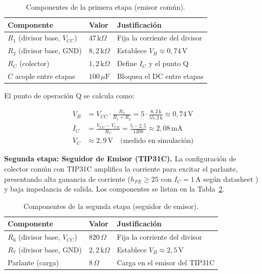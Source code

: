 \documentclass[12pt,onecolumn]{IEEEtran}
\begin{document}
\begin{table}[H]
\centering
\caption{Componentes de la primera etapa (emisor común).}
\label{tab:emisor_comun}
\begin{tabular}{lll}
\toprule
\textbf{Componente} & \textbf{Valor} & \textbf{Justificación} \\
\midrule
$R_1$ (divisor base, $V_{CC}$) & $47\,\text{k}\Omega$    & Fija la corriente del divisor \\
$R_2$ (divisor base, GND)      & $8{,}2\,\text{k}\Omega$ & Establece $V_B \approx 0{,}74\,\text{V}$ \\
$R_C$ (colector)               & $1{,}2\,\text{k}\Omega$ & Define $I_C$ y el punto Q \\
$C$ acople entre etapas        & $100\,\mu\text{F}$      & Bloquea el DC entre etapas \\
\bottomrule
\end{tabular}
\end{table}

El punto de operación Q se calcula como:

\begin{align}
    V_B &= V_{CC} \cdot \frac{R_2}{R_1 + R_2}
         = 5 \cdot \frac{8{,}2\,\text{k}}{55{,}2\,\text{k}}
         \approx 0{,}74\,\text{V} \\
    I_C &= \frac{V_{CC} - V_{CE}}{R_C}
         = \frac{5 - 2{,}5}{1200}
         \approx 2{,}08\,\text{mA} \\
    V_C &\approx 2{,}9\,\text{V} \quad \text{(medido en simulación)}
\end{align}

\textbf{Segunda etapa: Seguidor de Emisor (TIP31C).}
La configuración de colector común con TIP31C amplifica la corriente para excitar el parlante, presentando alta ganancia de corriente ($h_{FE} \geq 25$ con $I_C = 1\,\text{A}$ según datasheet \cite{tip31ds}) y baja impedancia de salida. Los componentes se listan en la Tabla~\ref{tab:seguidor_emisor}.

\begin{table}[H]
\centering
\caption{Componentes de la segunda etapa (seguidor de emisor).}
\label{tab:seguidor_emisor}
\begin{tabular}{lll}
\toprule
\textbf{Componente} & \textbf{Valor} & \textbf{Justificación} \\
\midrule
$R_6$ (divisor base, $V_{CC}$) & $820\,\Omega$           & Fija la corriente del divisor \\
$R_7$ (divisor base, GND)      & $2{,}2\,\text{k}\Omega$ & Establece $V_B \approx 2{,}5\,\text{V}$ \\
Parlante (carga)               & $8\,\Omega$             & Carga en el emisor del TIP31C \\
\bottomrule
\end{tabular}
\end{table}
\end{document}
